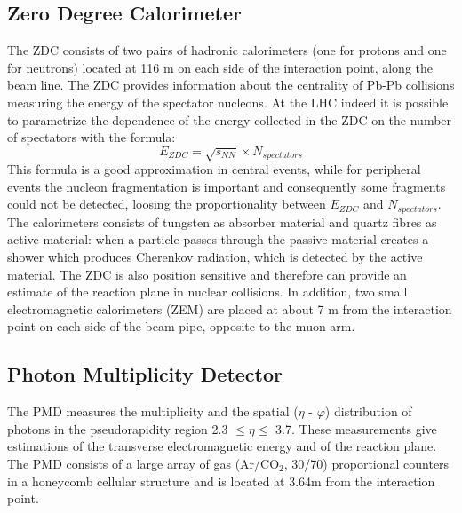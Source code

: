 \subsection*{Zero Degree Calorimeter}
The ZDC consists of two pairs of hadronic calorimeters (one for protons and one for neutrons) located at 116 m on each side of the interaction point, along the beam line. The ZDC provides information about the centrality of Pb-Pb collisions measuring the energy of the spectator nucleons. At the LHC indeed it is possible to parametrize the dependence of the energy collected in the ZDC on the number of spectators with the formula:
\begin{equation*}
 E_{ZDC} = \sqrt{s_{NN}} \times N_{spectators}
\end{equation*}
This formula is a good approximation in central events, while for peripheral events the nucleon fragmentation is important and consequently some fragments could not be detected, loosing the proportionality between $E_{ZDC}$ and $N_{spectators}$.\\
The calorimeters consists of tungsten as absorber material and quartz fibres as active material: when a particle passes through the passive material creates a shower which produces Cherenkov radiation, which is detected by the active material. The ZDC is also position sensitive and therefore can provide an estimate of the reaction plane in nuclear collisions.
In addition, two small electromagnetic calorimeters (ZEM) are placed at about 7 m from the interaction point on each side of the beam pipe, opposite to the muon arm.
\subsection*{Photon Multiplicity Detector}
The PMD measures the multiplicity and the spatial ($\eta$ - $\varphi$) distribution of photons in the pseudorapidity region 2.3 $\leq \eta \leq$ 3.7. These measurements give estimations of the transverse electromagnetic energy and of the reaction plane. The PMD consists of a large array of gas (Ar/CO$_2$, 30/70) proportional counters in a honeycomb cellular structure and is located at 3.64m from the interaction point.
